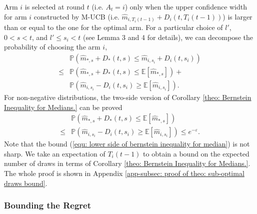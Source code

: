 \begin{proof-sketch}
Arm $i$ is selected at round $t$ (i.e. $A_t = i$) only when the upper confidence width for arm $i$ constructed by M-UCB (i.e. $\hat{m}_{i, T_i\left(t-1\right)} +  D_i\left(t, T_i\left(t-1\right)\right)$) is larger than or equal to the one for the optimal arm. 
For a particular choice of $l'$, $0 < s <t$, and $l' \leq s_i <t$ (see Lemma 3 and 4 for details), we can decompose the probability of choosing the arm $i$, 
\begin{align}
    & \mathbb{P}\left(\hat{m}_{*, s} +  D_*(t, s)  \leq \hat{m}_{i, s_i} +  D_i(t, s_i)\right) \nonumber \\
    \leq &  \mathbb{P}\left(\hat{m}_{*, s} +  D_*(t, s) \leq  \mathbb{E}[\hat{m}_{*, s}]\right) + \nonumber \\ & \mathbb{P}\left(\hat{m}_{i, s_i} -  D_i(t, s_i) \geq \mathbb{E}[\hat{m}_{i, s_i}]\right).
\end{align}
For non-negative distributions, the two-side version of Corollary \ref{theo: Bernstein Inequality for Medians.} can be proved 
\begin{align}
        & \mathbb{P}\left(\hat{m}_{*, s} +  D_*(t, s) \leq  \mathbb{E}[\hat{m}_{*, s}]\right) \nonumber\\ 
\label{equ: lower side of bernstein inequality for median}
        \leq & \mathbb{P}\left(\hat{m}_{i, s_i} -  D_i(t, s_i) \geq \mathbb{E}[\hat{m}_{i, s_i}]\right)
        \leq   e^{- \varepsilon}.
    \end{align}
Note that the bound (\ref{equ: lower side of bernstein inequality for median}) is not sharp. 
We take an expectation of $T_i(t-1)$ 
to obtain a bound on the expected number of draws in terms of Corollary \ref{theo: Bernstein Inequality for Medians.}.
The whole proof is shown in Appendix \ref{app-subsec: proof of theo: sub-optimal draws bound}.

\end{proof-sketch}


\subsubsection{Bounding the Regret}
\label{subsec: Bounding the Regret}

